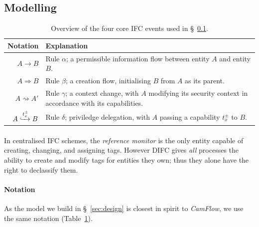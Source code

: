\subsection{Modelling}
\label{sec:ifc-modelling}

\begin{table}
    \centering
    \newcommand\tableTop{\rule{0pt}{3ex}}
    \newcommand\tableMid{\rule{0pt}{3ex}}
    \newcommand\tableBottom{\rule[-2ex]{0pt}{0pt}}
    \begin{tabular}{r p{10cm}} 
        \hline
        Notation & Explanation \\ [0.1ex] 
        \hline
            \tableTop{$A \rightarrow B$} & \tableTop{Rule $\alpha$; a permissible information flow between entity $A$ and entity $B$.} \\
            
            $A \Rightarrow B$ & \tableMid{Rule $\beta$; a creation flow, initialising $B$ from $A$ as its parent.} \\

            $A \rightsquigarrow A'$ & \tableMid{Rule $\gamma$; a context change, with $A$ modifying its security context in accordance with its capabilities.} \\
            
            $A \xhookrightarrow[]{t^{\pm}_{x}} B$ & \tableMid{Rule $\delta$; priviledge delegation, with $A$ passing a capability $t_{x}^{\pm}$ to $B$.} \tableBottom \\
    \end{tabular}
    \caption{Overview of the four core IFC events used in §~\ref{sec:ifc-modelling}.}
    \label{table:ifc-notation}
\end{table}


\paragraph{} In centralised IFC schemes, the \textit{reference monitor} is the only entity capable of creating, changing, and assigning tags. However DIFC gives \textit{all} processes the ability to create and modify tags for entities they own; thus they alone have the right to declassify them.

\paragraph{Notation} As the model we build in §~\ref{sec:design} is closest in spirit to \textit{CamFlow}, we use the same notation (Table~\ref{table:ifc-notation}).

